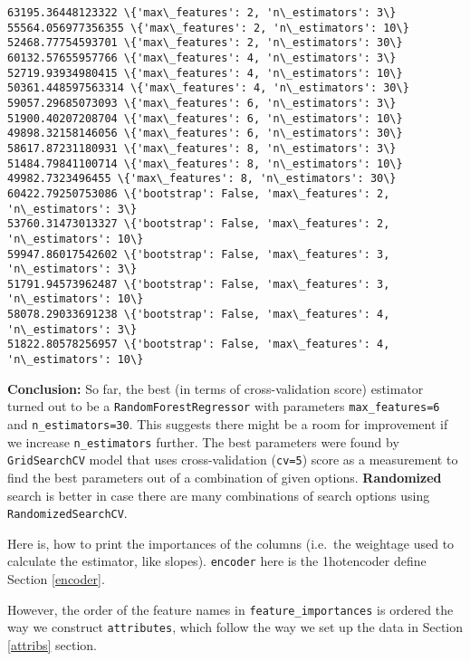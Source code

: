 \documentclass[11pt]{article}
\begin{document}
    \begin{Verbatim}[commandchars=\\\{\}]
63195.36448123322 \{'max\_features': 2, 'n\_estimators': 3\}
55564.056977356355 \{'max\_features': 2, 'n\_estimators': 10\}
52468.77754593701 \{'max\_features': 2, 'n\_estimators': 30\}
60132.57655957766 \{'max\_features': 4, 'n\_estimators': 3\}
52719.93934980415 \{'max\_features': 4, 'n\_estimators': 10\}
50361.448597563314 \{'max\_features': 4, 'n\_estimators': 30\}
59057.29685073093 \{'max\_features': 6, 'n\_estimators': 3\}
51900.40207208704 \{'max\_features': 6, 'n\_estimators': 10\}
49898.32158146056 \{'max\_features': 6, 'n\_estimators': 30\}
58617.87231180931 \{'max\_features': 8, 'n\_estimators': 3\}
51484.79841100714 \{'max\_features': 8, 'n\_estimators': 10\}
49982.7323496455 \{'max\_features': 8, 'n\_estimators': 30\}
60422.79250753086 \{'bootstrap': False, 'max\_features': 2, 'n\_estimators': 3\}
53760.31473013327 \{'bootstrap': False, 'max\_features': 2, 'n\_estimators': 10\}
59947.86017542602 \{'bootstrap': False, 'max\_features': 3, 'n\_estimators': 3\}
51791.94573962487 \{'bootstrap': False, 'max\_features': 3, 'n\_estimators': 10\}
58078.29033691238 \{'bootstrap': False, 'max\_features': 4, 'n\_estimators': 3\}
51822.80578256957 \{'bootstrap': False, 'max\_features': 4, 'n\_estimators': 10\}

    \end{Verbatim}

    \textbf{Conclusion:} So far, the best (in terms of cross-validation
score) estimator turned out to be a \texttt{RandomForestRegressor} with
parameters \texttt{max\_features=6} and \texttt{n\_estimators=30}. This
suggests there might be a room for improvement if we increase
\texttt{n\_estimators} further. The best parameters were found by
\texttt{GridSearchCV} model that uses cross-validation (\texttt{cv=5})
score as a measurement to find the best parameters out of a combination
of given options. \textbf{Randomized} search is better in case there are
many combinations of search options using \texttt{RandomizedSearchCV}.

    Here is, how to print the importances of the columns (i.e.~the weightage
used to calculate the estimator, like slopes). \texttt{encoder} here is
the 1hotencoder define Section \ref{encoder}.

However, the order of the feature names in \texttt{feature\_importances}
is ordered the way we construct \texttt{attributes}, which follow the
way we set up the data in Section \ref{attribs} section.
\end{document}
